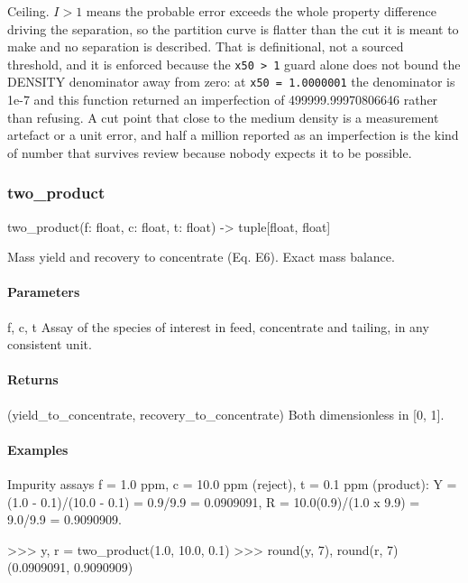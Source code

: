 \documentclass[10pt,a4paper,twoside]{report}
\begin{document}
Ceiling. $I > 1$ means the probable error exceeds the whole property difference driving the separation, so the partition curve is flatter than the cut it is meant to make and no separation is described. That is definitional, not a sourced threshold, and it is enforced because the \texttt{x50 > 1} guard alone does not bound the DENSITY denominator away from zero: at \texttt{x50 = 1.0000001} the denominator is 1e-7 and this function returned an imperfection of 499999.99970806646 rather than refusing. A cut point that close to the medium density is a measurement artefact or a unit error, and half a million reported as an imperfection is the kind of number that survives review because nobody expects it to be possible.

\subsubsection*{two\_product}

\begin{verbatimsmall}
two_product(f: float, c: float, t: float) -> tuple[float, float]
\end{verbatimsmall}

Mass yield and recovery to concentrate (Eq. E6). Exact mass balance.

\paragraph*{Parameters}

f, c, t Assay of the species of interest in feed, concentrate and tailing, in any consistent unit.

\paragraph*{Returns}

(yield\_to\_concentrate, recovery\_to\_concentrate) Both dimensionless in [0, 1].

\paragraph*{Examples}

Impurity assays f = 1.0 ppm, c = 10.0 ppm (reject), t = 0.1 ppm (product): Y = (1.0 - 0.1)/(10.0 - 0.1) = 0.9/9.9 = 0.0909091, R = 10.0(0.9)/(1.0 x 9.9) = 9.0/9.9 = 0.9090909.

\begin{doctestblock}
>>> y, r = two_product(1.0, 10.0, 0.1)
>>> round(y, 7), round(r, 7)
(0.0909091, 0.9090909)
\end{doctestblock}
\end{document}
